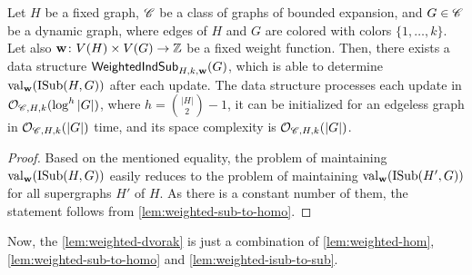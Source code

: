 \begin{lemma} \label{lem:weighted-isub-to-sub}
	Let $H$ be a fixed graph, $\mathscr C$ be a class of graphs of bounded expansion, and $G \in \mathscr C$ be a dynamic graph, where edges of $H$ and $G$ are colored with colors $\{1, \ldots, k\}$. Let also $\mathbf{w} \colon V(H) \times V(G) \to \mathbb{Z}$ be a fixed weight function. Then, there exists a data structure $\mathsf{WeightedIndSub}_{H, k, \mathbf{w}}(G)$, which is able to determine $\mathrm{val}_{\mathbf{w}}(\mathrm{ISub}(H, G))$ after each update.
	The data structure processes each update in $\mathcal{O}_{\mathscr C, H, k}(\log^h |G|)$, where $h = {|H| \choose 2} - 1$, it can be initialized for an edgeless graph in $\mathcal{O}_{\mathscr C, H, k}(|G|)$ time, and its space complexity is $\mathcal{O}_{\mathscr C, H, k}(|G|)$.%
\end{lemma}
\begin{proof}
	Based on the mentioned equality, the problem of maintaining $\mathrm{val}_{\mathbf{w}}(\mathrm{ISub}(H, G))$ easily reduces to the problem of maintaining $\mathrm{val}_{\mathbf{w}}(\mathrm{ISub}(H', G))$ for all supergraphs $H'$ of $H$. As there is a constant number of them, the statement follows from \cref{lem:weighted-sub-to-homo}.
\end{proof}

Now, the \cref{lem:weighted-dvorak} is just a combination of \cref{lem:weighted-hom}, \cref{lem:weighted-sub-to-homo} and \cref{lem:weighted-isub-to-sub}. 